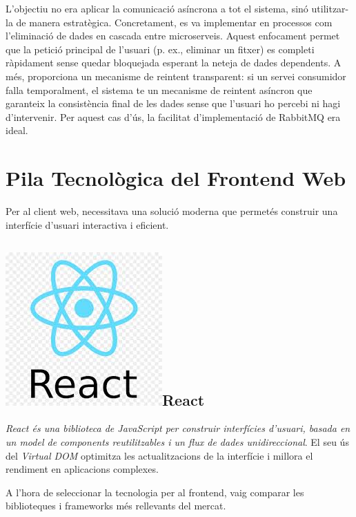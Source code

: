 L'objectiu no era aplicar la comunicació asíncrona a tot el sistema, sinó utilitzar-la de manera estratègica. Concretament, es va implementar en processos com l'eliminació de dades en cascada entre microserveis. Aquest enfocament permet que la petició principal de l'usuari (p. ex., eliminar un fitxer) es completi ràpidament sense quedar bloquejada esperant la neteja de dades dependents. A més, proporciona un mecanisme de reintent transparent: si un servei consumidor falla temporalment, el sistema te un mecanisme de reintent asíncron que garanteix la consistència final de les dades sense que l'usuari ho percebi ni hagi d'intervenir. Per aquest cas d'ús, la facilitat d'implementació de RabbitMQ era ideal.

\section{Pila Tecnològica del Frontend Web}
Per al client web, necessitava una solució moderna que permetés construir una interfície d'usuari interactiva i eficient.

\newcommand{\react}{\includegraphics[height=8ex]{Figures/logos/react.jpeg}}

\subsection{\react\hspace{0.5em}React}
\textit{React és una biblioteca de JavaScript per construir interfícies d'usuari, basada en un model de components reutilitzables i un flux de dades unidireccional}. El seu ús del \textit{Virtual DOM} optimitza les actualitzacions de la interfície i millora el rendiment en aplicacions complexes.

A l'hora de seleccionar la tecnologia per al frontend, vaig comparar les biblioteques i frameworks més rellevants del mercat.

